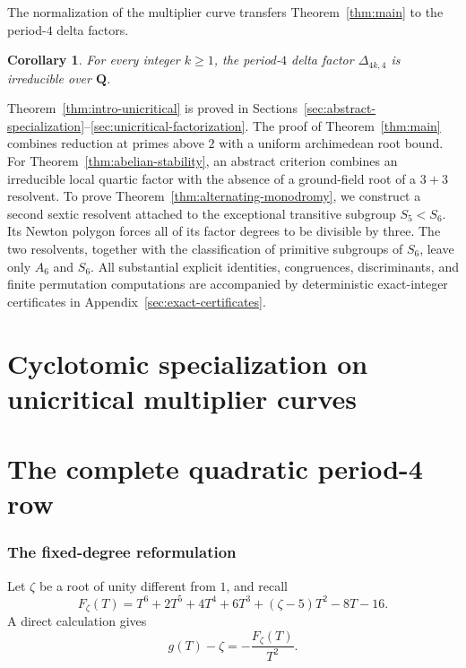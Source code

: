 \documentclass[11pt]{article}
\newtheorem{corollary}[theorem]{Corollary}
\newcommand{\Q}{\mathbf Q}
\begin{document}
The normalization of the multiplier curve transfers
Theorem~\ref{thm:main}
to the period-$4$ delta factors.

\begin{corollary}\label{cor:delta-main}
For every integer $k\geq1$, the period-$4$ delta factor
$\Delta_{4k,4}$ is irreducible over $\Q$.
\end{corollary}

Theorem~\ref{thm:intro-unicritical} is proved in
Sections~\ref{sec:abstract-specialization}--\ref{sec:unicritical-factorization}.
The proof of Theorem~\ref{thm:main} combines reduction at primes above
$2$ with a uniform archimedean root bound.  For
Theorem~\ref{thm:abelian-stability}, an abstract criterion combines an
irreducible local quartic factor with the absence of a ground-field root
of a $3+3$ resolvent.  To prove
Theorem~\ref{thm:alternating-monodromy}, we construct a second sextic
resolvent attached to the exceptional transitive subgroup
$S_5<S_6$.  Its Newton polygon forces all of its factor degrees to be
divisible by three.  The two resolvents, together with the classification
of primitive subgroups of $S_6$, leave only $A_6$ and $S_6$.
All substantial explicit identities, congruences, discriminants, and
finite permutation computations are accompanied by deterministic
exact-integer certificates in Appendix~\ref{sec:exact-certificates}.

\part{Cyclotomic specialization on unicritical multiplier curves}







\part{The complete quadratic period-4 row}

\section{The fixed-degree reformulation}

Let $\zeta$ be a root of unity different from $1$, and recall
\begin{equation}\label{eq:Fzeta}
 F_\zeta(T)=T^6+2T^5+4T^4+6T^3+(\zeta-5)T^2-8T-16.
\end{equation}
A direct calculation gives
\begin{equation}\label{eq:g-F}
 g(T)-\zeta=-\frac{F_\zeta(T)}{T^2}.
\end{equation}
\end{document}
